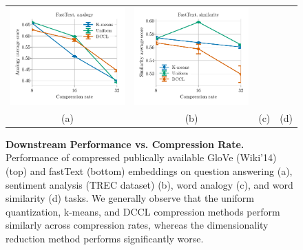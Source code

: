 \begin{figure}
\begin{tabular}{@{\hskip -0.0in}c@{\hskip -0.0in}c@{\hskip -0.0in}c@{\hskip -0.0in}c@{\hskip -0.0in}}
		\includegraphics[width=.245\linewidth]{figures/fasttext1m_intrinsics_analogy-avg-score_vs_compression_linx.pdf} &
		\includegraphics[width=.245\linewidth]{figures/fasttext1m_intrinsics_similarity-avg-score_vs_compression_linx.pdf} \\
		\;\;\;\;\;(a) & \;\;\;\;\;\;(b) & \;\;\;\;\;\;(c) & \;\;\;\;\;\;(d)
	\end{tabular}
	\caption{
		\textbf{Downstream Performance vs. Compression Rate.}
		Performance of compressed publically available GloVe (Wiki'14) (top) and fastText (bottom) embeddings on question answering (a), sentiment analysis (TREC dataset) (b), word analogy (c), and word similarity (d) tasks.
		We generally observe that the uniform quantization, k-means, and DCCL compression methods perform similarly across compression rates, whereas the dimensionality reduction method performs significantly worse.
	}
	\label{fig:perf_comp}
\end{figure}


